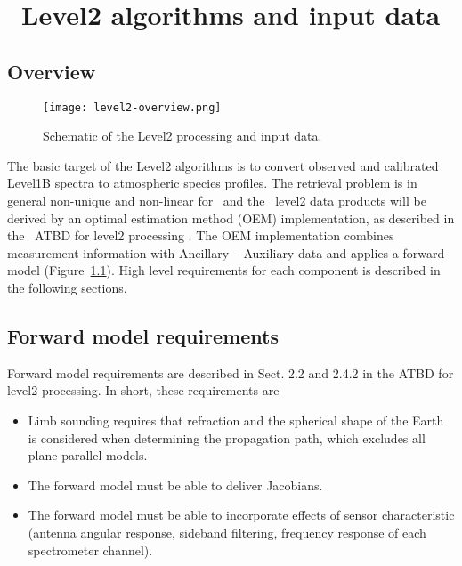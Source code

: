 \chapter{\smr\ Level2 algorithms and input data}
\label{level2-algorithms}
\section{Overview}


\begin{figure}[t]
\texttt{[image: level2-overview.png]}
\caption{Schematic of the Level2 processing and input data.}
\label{fig:level2}
\end{figure}

The basic target of the Level2 algorithms is to
convert observed and calibrated Level1B spectra
to atmospheric species profiles.
The retrieval problem is in general non-unique 
and non-linear for \smr\,  
and the \smr\ level2 data products will be derived by an
optimal estimation method (OEM) implementation, as described
in the \smr\ ATBD for level2 processing \citep{atbdl2}.
The OEM implementation combines measurement information with 
Ancillary -- Auxiliary data and applies a forward 
model (Figure~\ref{fig:level2}). High level requirements for each 
component is described in the following sections.

\section{Forward model requirements}

Forward model requirements are described in Sect. 2.2
and 2.4.2 in the ATBD for level2 processing.
In short, these requirements are

\begin{itemize}

\item Limb sounding requires that refraction and the spherical shape
of the Earth is considered when determining the propagation path,
which excludes all plane-parallel models. 

\item The forward model must be able to deliver Jacobians.

\item The forward model must be able to incorporate effects of
sensor characteristic (antenna angular response, sideband filtering,
frequency response of each spectrometer channel).

\end{itemize}

